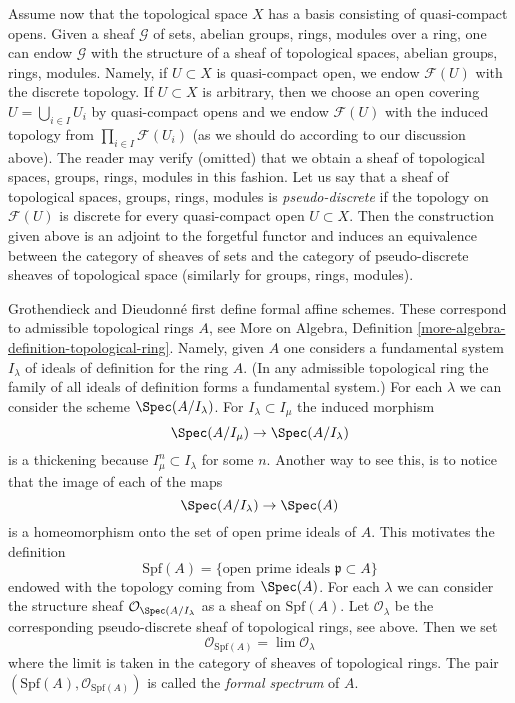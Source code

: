 \medskip\noindent
Assume now that the topological space $X$ has a basis consisting
of quasi-compact opens. Given a sheaf $\mathcal{G}$ of sets, abelian groups,
rings, modules over a ring, one can endow $\mathcal{G}$ with
the structure of a sheaf of topological spaces, abelian groups,
rings, modules. Namely, if $U \subset X$ is quasi-compact open,
we endow $\mathcal{F}(U)$ with the discrete topology. If $U \subset X$
is arbitrary, then we choose an open covering $U = \bigcup_{i \in I} U_i$
by quasi-compact opens and we endow $\mathcal{F}(U)$ with
the induced topology from $\prod_{i \in I} \mathcal{F}(U_i)$
(as we should do according to our discussion above).
The reader may verify (omitted) that we obtain a sheaf of topological
spaces, groups, rings, modules in this fashion. Let us say
that a sheaf of topological spaces, groups, rings, modules is
{\it pseudo-discrete} if the topology on $\mathcal{F}(U)$ is
discrete for every quasi-compact open $U \subset X$. Then
the construction given above is an adjoint to the forgetful functor
and induces an equivalence between the category of sheaves
of sets and the category of pseudo-discrete sheaves of topological space
(similarly for groups, rings, modules).

\medskip\noindent
Grothendieck and Dieudonn\'e first define formal affine schemes.
These correspond to admissible topological rings $A$, see
More on Algebra, Definition \ref{more-algebra-definition-topological-ring}.
Namely, given $A$ one considers a fundamental system $I_\lambda$ of ideals
of definition for the ring $A$. (In any admissible topological ring
the family of all ideals of definition forms a fundamental system.)
For each $\lambda$ we can consider the
scheme $\Spec(A/I_\lambda)$. For $I_\lambda \subset I_\mu$ the induced
morphism
$$
\Spec(A/I_\mu) \to \Spec(A/I_\lambda)
$$
is a thickening because $I_\mu^n \subset I_\lambda$ for some $n$.
Another way to see this, is to notice that the image of each of the
maps
$$
\Spec(A/I_\lambda) \to \Spec(A)
$$
is a homeomorphism onto the set of open prime ideals of $A$.
This motivates the definition
$$
\text{Spf}(A) = \{\text{open prime ideals }\mathfrak p \subset A\}
$$
endowed with the topology coming from $\Spec(A)$. For each $\lambda$
we can consider the structure sheaf $\mathcal{O}_{\Spec(A/I_\lambda}$
as a sheaf on $\text{Spf}(A)$. Let $\mathcal{O}_\lambda$ be the corresponding
pseudo-discrete sheaf of topological rings, see above.
Then we set
$$
\mathcal{O}_{\text{Spf}(A)} = \lim \mathcal{O}_\lambda
$$
where the limit is taken in the category of sheaves of topological rings.
The pair $(\text{Spf}(A), \mathcal{O}_{\text{Spf}(A)})$ is called the
{\it formal spectrum} of $A$.

